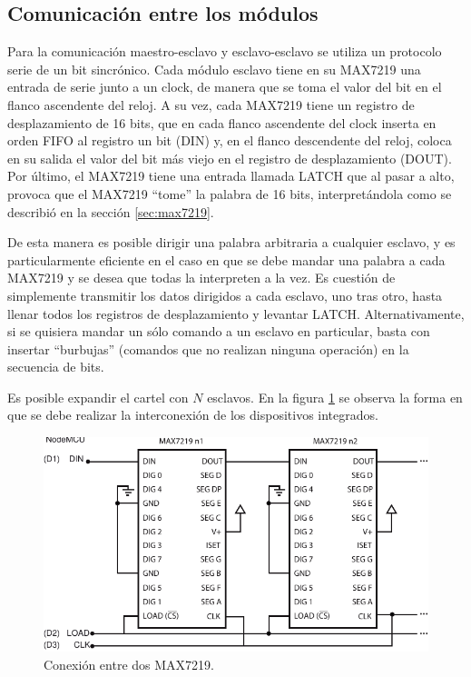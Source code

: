 \subsection{Comunicación entre los módulos}
Para la comunicación maestro-esclavo y esclavo-esclavo se utiliza un protocolo serie de un bit sincrónico. Cada módulo esclavo tiene en su MAX7219 una entrada de serie junto a un clock, de manera que se toma el valor del bit en el flanco ascendente del reloj. A su vez, cada MAX7219 tiene un registro de desplazamiento de 16 bits, que en cada flanco ascendente del clock inserta en orden FIFO al registro un bit (DIN) y, en el flanco descendente del reloj, coloca en su salida el valor del bit más viejo en el registro de desplazamiento (DOUT). Por último, el MAX7219 tiene una entrada llamada LATCH que al pasar a alto, provoca que el MAX7219 \enquote{tome} la palabra de 16 bits, interpretándola como se describió en la sección \ref{sec:max7219}.

De esta manera es posible dirigir una palabra arbitraria a cualquier esclavo, y es particularmente eficiente en el caso en que se debe mandar una palabra a cada MAX7219 y se desea que todas la interpreten a la vez. Es cuestión de simplemente transmitir los datos dirigidos a cada esclavo, uno tras otro, hasta llenar todos los registros de desplazamiento y levantar LATCH. Alternativamente, si se quisiera mandar un sólo comando a un esclavo en particular, basta con insertar \enquote{burbujas} (comandos que no realizan ninguna operación) en la secuencia de bits.

Es posible expandir el cartel con $N$ esclavos. En la figura \ref{fig:MAX-MAX} se observa la forma en que se debe realizar la interconexión de los dispositivos integrados.

\begin{figure}[ht!]
	\centering
	\begin{center}
		\includegraphics[width=\textwidth]{imagenes/hw/MAX-daisychain.pdf}
		\caption{Conexión entre dos MAX7219.}
		\label{fig:MAX-MAX}
	\end{center}
\end{figure}

